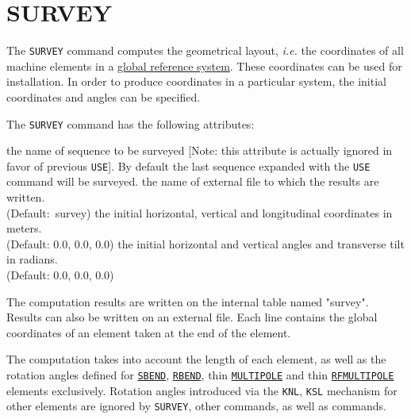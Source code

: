  
\chapter{SURVEY}
\label{chap:survey}

The \texttt{SURVEY} command computes the geometrical layout,
\textsl{i.e.} the coordinates of all machine elements in a 
\hyperref[sec:global-ref]{global reference system}. These
coordinates can be used for installation. In order to produce
coordinates in a particular system, the initial coordinates and angles
can be specified. 


The \texttt{SURVEY} command has the following attributes:
\begin{madlist}
   the name of sequence to be surveyed [Note: this attribute is actually ignored in favor of previous \texttt{USE}]. By default the
  last sequence expanded with the \texttt{USE} command will be surveyed.  
    the name of external file to which the results are
  written.\\ (Default:~survey)
   the initial horizontal, vertical and longitudinal
  coordinates in meters.\\ (Default: 0.0, 0.0, 0.0) 
   the initial horizontal and vertical angles
  and transverse tilt in radians.\\ (Default: 0.0, 0.0, 0.0)
\end{madlist}

The computation results are written on the internal table named
"survey". Results can also be written on an external file. Each line
contains the global coordinates of an element taken at the end of the
element.

The computation takes into account the length of each element, as well
as the rotation angles defined for \hyperref[bend-sbend]{\texttt{SBEND}},
\hyperref[bend-rbend]{\texttt{RBEND}}, thin
\hyperref[sec:multipole]{\texttt{MULTIPOLE}} and thin
\hyperref[sec:rfmultipole]{\texttt{RFMULTIPOLE}} 
elements exclusively.  Rotation angles introduced via the \texttt{KNL},
\texttt{KSL} mechanism for other elements are ignored by
\texttt{SURVEY}, other \madx commands, as well as \ptc commands. 


